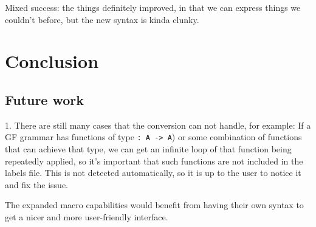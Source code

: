 Mixed success: the things definitely improved, in that we can express things we couldn't before, but the new syntax is kinda clunky.

\section{Conclusion}


\subsection{Future work}


1. There are still many cases that the conversion can not handle, for example: If a GF grammar has functions of type \lstinline{: A -> A}) or some combination of functions that can achieve that type, we can get an infinite loop of that function being repeatedly applied, so it's important that such functions are not included in the labels file. This is not detected automatically, so it is up to the user to notice it and fix the issue.


The expanded macro capabilities would benefit from having their own syntax to get a nicer and more user-friendly interface.